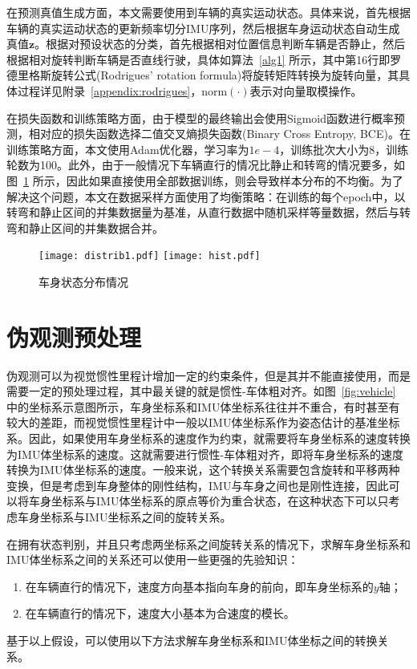 在预测真值生成方面，本文需要使用到车辆的真实运动状态。具体来说，首先根据车辆的真实运动状态的更新频率切分IMU序列，然后根据车身运动状态自动生成真值$\symbf{z}$。根据对预设状态的分类，首先根据相对位置信息判断车辆是否静止，然后根据相对旋转判断车辆是否直线行驶，具体如算法~\ref{alg1} 所示，其中第16行即罗德里格斯旋转公式(Rodrigues' rotation formula)\cite{dai2015euler}将旋转矩阵转换为旋转向量，其具体过程详见附录~\ref{appendix:rodrigues}，$\text{norm}(\cdot)$表示对向量取模操作。


在损失函数和训练策略方面，由于模型的最终输出会使用Sigmoid函数进行概率预测，相对应的损失函数选择二值交叉熵损失函数(Binary Cross Entropy, BCE)。在训练策略方面，本文使用Adam优化器\cite{kingma2014adam}，学习率为$1e-4$，训练批次大小为8，训练轮数为100。此外，由于一般情况下车辆直行的情况比静止和转弯的情况要多，如图~\ref{fig:data_distrib} 所示，因此如果直接使用全部数据训练，则会导致样本分布的不均衡。为了解决这个问题，本文在数据采样方面使用了均衡策略：在训练的每个epoch中，以转弯和静止区间的并集数据量为基准，从直行数据中随机采样等量数据，然后与转弯和静止区间的并集数据合并。

\begin{figure}
  \centering
  \texttt{[image: distrib1.pdf]}
  \texttt{[image: hist.pdf]}
  \caption{车身状态分布情况}
  \label{fig:data_distrib}
\end{figure}

\section{伪观测预处理}

伪观测可以为视觉惯性里程计增加一定的约束条件，但是其并不能直接使用，而是需要一定的预处理过程，其中最关键的就是惯性-车体粗对齐。如图~\ref{fig:vehicle} 中的坐标系示意图所示，车身坐标系和IMU体坐标系往往并不重合，有时甚至有较大的差距，而视觉惯性里程计中一般以IMU体坐标系作为姿态估计的基准坐标系。因此，如果使用车身坐标系的速度作为约束，就需要将车身坐标系的速度转换为IMU体坐标系的速度。这就需要进行惯性-车体粗对齐，即将车身坐标系的速度转换为IMU体坐标系的速度。一般来说，这个转换关系需要包含旋转和平移两种变换，但是考虑到车身整体的刚性结构，IMU与车身之间也是刚性连接，因此可以将车身坐标系与IMU体坐标系的原点等价为重合状态，在这种状态下可以只考虑车身坐标系与IMU坐标系之间的旋转关系。

在拥有状态判别，并且只考虑两坐标系之间旋转关系的情况下，求解车身坐标系和IMU体坐标系之间的关系还可以使用一些更强的先验知识：
\begin{enumerate}
  \item 在车辆直行的情况下，速度方向基本指向车身的前向，即车身坐标系的$y$轴；
  \item 在车辆直行的情况下，速度大小基本为合速度的模长。
\end{enumerate}
基于以上假设，可以使用以下方法求解车身坐标系和IMU体坐标之间的转换关系。

